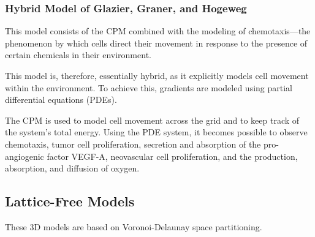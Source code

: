 \subsubsection{Hybrid Model of Glazier, Graner, and Hogeweg}
This model consists of the CPM combined with the modeling of chemotaxis—the phenomenon by which cells direct their movement in response to the presence of certain chemicals in their environment.

This model is, therefore, essentially hybrid, as it explicitly models cell movement within the environment. To achieve this, gradients are modeled using partial differential equations (PDEs).

The CPM is used to model cell movement across the grid and to keep track of the system's total energy. Using the PDE system, it becomes possible to observe chemotaxis, tumor cell proliferation, secretion and absorption of the pro-angiogenic factor VEGF-A, neovascular cell proliferation, and the production, absorption, and diffusion of oxygen.

\subsection{Lattice-Free Models}
These 3D models are based on Voronoi-Delaunay space partitioning.

